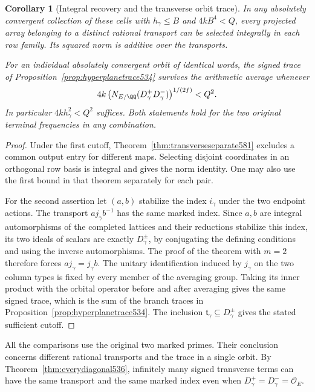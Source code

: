 \documentclass[a4paper,11pt]{article}
\newtheorem{corollary}[proposition]{Corollary}
\theoremstyle{definition}
\theoremstyle{remark}
\numberwithin{equation}{section}
\begin{document}
\begin{corollary}[Integral recovery and the transverse orbit trace]
\leavevmode\label{cor:transversetrace581}
In any absolutely convergent collection of these cells with
\(h_\gamma\le B\) and \(4kB^4<Q\), every projected array
belonging to a distinct rational transport can be selected
integrally in each row family. Its squared norm is additive
over the transports.

For an individual absolutely convergent orbit of identical
words, the signed trace of Proposition~\ref{prop:hyperplanetrace534}
survives the arithmetic average whenever
\[
 4k\,\bigl(N_{E/\QQ}(D_\gamma^+D_\gamma^-)\bigr)^{1/(2f)}
       < Q^2 .
\]
In particular \(4k h_\gamma^2<Q^2\) suffices. Both statements
hold for the two original terminal frequencies in any combination.
\end{corollary}
\begin{proof}
Under the first cutoff, Theorem~\ref{thm:transverseseparate581}
excludes a common output entry for different maps. Selecting
disjoint coordinates in an orthogonal row basis is integral
and gives the norm identity. One may also use the first bound
in that theorem separately for each pair.

For the second assertion let \((a,b)\) stabilize the index
\(i_\gamma\) under the two endpoint actions. The transport
\(aj_\gamma b^{-1}\) has the same marked index. Since \(a,b\)
are integral automorphisms of the completed lattices and their
reductions stabilize this index, its two ideals of scalars
are exactly \(D_\gamma^\pm\), by conjugating the defining
conditions and using the inverse automorphisms. The proof of
the theorem with \(m=2\) therefore forces \(aj_\gamma=j_\gamma b\).
The unitary identification induced by \(j_\gamma\) on the
two column types is fixed by every member of the averaging
group. Taking its inner product with the orbital operator
before and after averaging gives the same signed trace, which
is the sum of the branch traces in
Proposition~\ref{prop:hyperplanetrace534}. The inclusion
\(\mathfrak t_\gamma\subseteq D_\gamma^\pm\) gives the
stated sufficient cutoff.
\end{proof}

All the comparisons use the original two marked primes. Their
conclusion concerns different rational transports and the
trace in a single orbit. By Theorem~\ref{thm:everydiagonal536},
infinitely many signed transverse terms can have the same transport
and the same marked index even when \(D_\gamma^+=D_\gamma^-=\mathcal O_E\).
\end{document}
